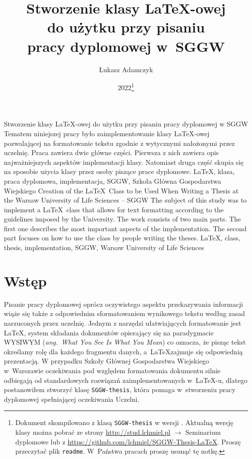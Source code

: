 \documentclass{SGGW-thesis}
\title{Stworzenie klasy \LaTeX-owej\\do użytku przy pisaniu\\pracy dyplomowej w~SGGW}
\author{Łukasz Adamczyk}
\date{2022\footnote{Dokument skompilowano z klasą {\tt SGGW-thesis} w wersji \version. Aktualną wersję klasy można pobrać ze strony \url{http://stud.lchmiel.pl} $\rightarrow$
Seminarium dyplomowe lub z \url{https://github.com/lchmiel/SGGW-Thesis-LaTeX}. Proszę przeczytać plik {\tt readme}. W~Państwa pracach proszę usunąć tę notkę.}}
\begin{document}
\maketitle
\statementpage
\abstractpage
{Stworzenie klasy \LaTeX-owej do użytku przy pisaniu pracy dyplomowej w SGGW}
{Tematem niniejszej pracy było zaimplementowanie klasy \LaTeX-owej pozwalającej na formatowanie tekstu zgodnie z wytycznymi nałożonymi przez uczelnię. Praca zawiera dwie
główne części. Pierwsza z nich zawiera opis najważniejszych aspektów implementacji klasy. Natomiast druga część skupia się na sposobie użycia klasy przez osoby piszące prace
dyplomowe.}
{LaTeX, klasa, praca dyplomowa, implementacja, SGGW, Szkoła Główna Gospodarstwa Wiejskiego}
{Creation of the \LaTeX\ Class to be Used When Writing a Thesis at the Warsaw University of Life Sciences -- SGGW}
{The subject of this study was to implement a \LaTeX\ class that allows for text formatting according to the guidelines imposed by the University. The work consists of two
main parts. The first one describes the most important aspects of the implementation. The second part focuses on how to use the class by people writing the theses.}
{LaTeX, class, thesis, implementation, SGGW, Warsaw University of Life Sciences}


{
  \doublespacing
  \tableofcontents
}

\startchapterfromoddpage %

\chapter{Wstęp}
Pisanie pracy dyplomowej oprócz oczywistego aspektu przekazywania informacji wiąże się także z odpowiednim sformatowaniem wynikowego tekstu według zasad narzuconych przez
uczelnię. Jednym z narzędzi ułatwiających formatowanie jest \LaTeX, system składania dokumentów opierający się na paradygmacie WYSIWYM ({\em ang.\ What You See Is What You
Mean}) co oznacza, że pisząc tekst określamy rolę dla każdego fragmentu danych, a~\LaTeX zajmuje się odpowiednią prezentacją. W przypadku Szkoły Głównej Gospodarstwa
Wiejskiego w~Warszawie oczekiwania pod względem formatowania dokumentu silnie odbiegają od standardowych rozwiązań zaimplementowanych w~\LaTeX-u, dlatego postanowiłem
stworzyć klasę {\tt SGGW-thesis}, która pomaga w~stworzeniu pracy dyplomowej spełniającej oczekiwania Uczelni.
\end{document}
